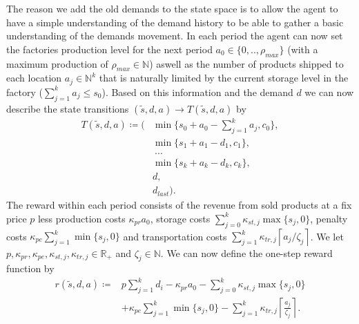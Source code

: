 \documentclass[journal, a4paper]{IEEEtran}
\theoremstyle{plain}
\theoremstyle{definition}
\begin{document}
The reason we add the old demands to the state space is to allow the agent to have a simple understanding of the demand history to be able to gather a basic understanding of the demands movement. In each period the agent can now set the factories production level for the next period $a_0 \in \{0,.., \rho_{max}\}$ (with a maximum production of $\rho_{max} \in \mathbb{N}$) aswell as the number of products shipped to each location $a_j \in \mathbb{N}^k$ that is naturally limited by the current storage level in the factory ($\sum_{j=1}^{k}a_j \leq s_0$). Based on this information and the demand $d$ we can now describe the state transitions $(\tilde{s}, d, a) \rightarrow T(\tilde{s},d,a)$ by
\begin{equation}
\label{eq:transition_function}
	\begin{split}
		T(\tilde{s}, d, a) \coloneqq (&\min\{s_0 + a_0 - \sum_{j=1}^{k}a_j, c_0 \}, \\
		&\min\{s_1 + a_1 - d_1, c_1 \}, \\
		&\ ... \\
		&\min\{s_k + a_k - d_k, c_k \}, \\
		&d, \\
		&d_{last}).
\end{split}
\end{equation}
The reward within each period consists of the revenue from sold products at a fix price $p$ less production costs $\kappa_{pr}a_0$, storage costs $\sum_{j=0}^{k}\kappa_{st,j} \max\{s_j, 0\}$, penalty costs $\kappa_{pe} \sum_{j=1}^{k}\min\{s_j,0\}$ and transportation costs $\sum_{j=1}^{k} \kappa_{tr, j} \left\lceil a_j / \zeta_j \right\rceil$. We let $p, \kappa_{pr}, \kappa_{pe}, \kappa_{st, j}, \kappa_{tr,j} \in \mathbb{R}_+$ and $\zeta_j \in \mathbb{N}$. We can now define the one-step reward function by
\begin{equation}
\label{eq:one_step_reward}
	\begin{split}
		r(\tilde{s}, d, a) \coloneqq &p \sum_{j=1}^{k}d_i - \kappa_{pr} a_0 - \sum_{j=0}^{k} \kappa_{st, j} \max\{s_j, 0\} \\ 
		&+\kappa_{pe} \sum_{j=1}^{k}\min\{s_j, 0\} - \sum_{j=1}^{k} \kappa_{tr, j} \left\lceil \frac{a_j}{\zeta_j} \right\rceil.
	\end{split}
\end{equation}
\end{document}
